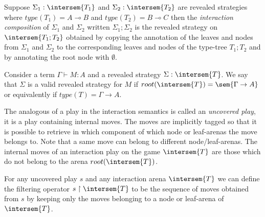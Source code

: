 \begin{dfn}
Suppose $\Sigma_1 : \intersem{T_1}$ and $\Sigma_2 : \intersem{T_2}$
are revealed strategies where $type(T_1) = A \multimap B$ and
$type(T_2) = B \multimap C$ then the \emph{interaction composition}
of $\Sigma_1$ and $\Sigma_2$ written $\Sigma_1 ; \Sigma_2$ is the
revealed strategy on $\intersem{T_1 ; T_2}$ obtained by copying the
annotation of the leaves and nodes from $\Sigma_1$ and $\Sigma_2$ to
the corresponding leaves and nodes of the type-tree $T_1 ; T_2$ and
by annotating the root node with $\emptyset$.
\end{dfn}

\begin{dfn}
Consider a term $\Gamma \vdash M : A$ and a revealed strategy
$\Sigma : \intersem{T}$. We say that $\Sigma$ is a valid revealed
strategy for $M$ if $root(\intersem{T}) = \sem{\Gamma \rightarrow
A}$ or equivalently if $type(T) = \Gamma \rightarrow A$.
\end{dfn}


The analogous of a play in the interaction semantics is called an \emph{uncovered
play}, it is a play containing internal moves. The moves are implicitly tagged so that it is possible to retrieve in which component
of which node or leaf-arenas the move belongs to. Note that a same move can belong to different node/leaf-arenas.
The internal moves of an interaction play on the game $\intersem{T}$ are those which do not
belong to the arena $root(\intersem{T})$.

For any uncovered play $s$ and any interaction arena $\intersem{T}$
we can define the filtering operator $s\upharpoonright \intersem{T}$ to be the
sequence of moves obtained from $s$ by keeping only the moves
belonging to a node or leaf-arena of $\intersem{T}$.


